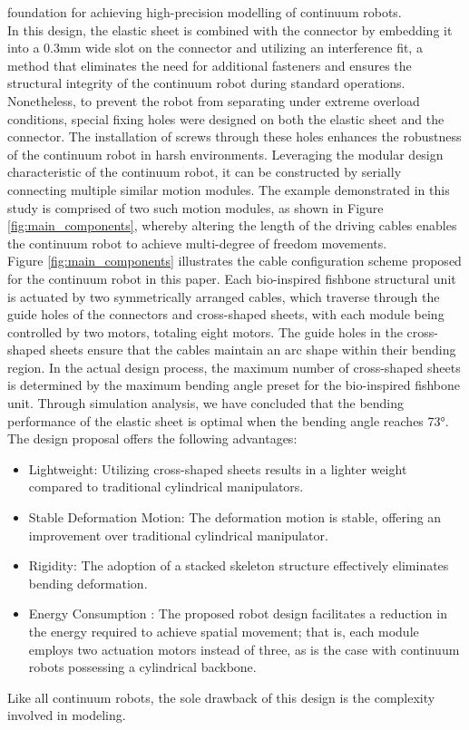 foundation for achieving high-precision modelling of continuum robots. \\
In this design, the elastic sheet is combined with the connector by embedding it into a 0.3mm wide slot on the connector 
and utilizing an interference fit, a method that eliminates the need for additional fasteners and ensures the structural 
integrity of the continuum robot during standard operations. Nonetheless, to prevent the robot from separating under 
extreme overload conditions, special fixing holes were designed on both the elastic sheet and the connector. The 
installation of screws through these holes enhances the robustness of the continuum robot in harsh environments. 
Leveraging the modular design characteristic of the continuum robot, it can be constructed by serially connecting 
multiple similar motion modules. The example demonstrated in this study is comprised of two such motion modules, as 
shown in Figure \ref{fig:main_components}, whereby altering the length of the driving cables enables the continuum 
robot to achieve multi-degree of freedom movements. \\
Figure \ref{fig:main_components} illustrates the cable configuration scheme proposed for the continuum robot in this 
paper. Each bio-inspired fishbone structural unit is actuated by two symmetrically arranged cables, which traverse 
through the guide holes of the connectors and cross-shaped sheets, with each module being controlled by two motors, 
totaling eight motors. The guide holes in the cross-shaped sheets ensure that the cables maintain an arc shape within 
their bending region. In the actual design process, the maximum number of cross-shaped sheets is determined by the 
maximum bending angle preset for the bio-inspired fishbone unit. Through simulation analysis, we have concluded that 
the bending performance of the elastic sheet is optimal when the bending angle reaches 73°. \\
The design proposal offers the following advantages: \\
\begin{itemize}
    \item Lightweight: Utilizing cross-shaped sheets results in a lighter weight compared to traditional cylindrical manipulators.
    \item Stable Deformation Motion: The deformation motion is stable, offering an improvement over traditional cylindrical manipulator.
    \item Rigidity: The adoption of a stacked skeleton structure effectively eliminates bending deformation.
    \item Energy Consumption \cite{bio_noval_method}: The proposed robot design facilitates a reduction in the energy required to achieve spatial movement; that is, each module employs two actuation motors instead of three, as is the case with continuum robots possessing a cylindrical backbone.
\end{itemize}
Like all continuum robots, the sole drawback of this design is the complexity involved in modeling.
